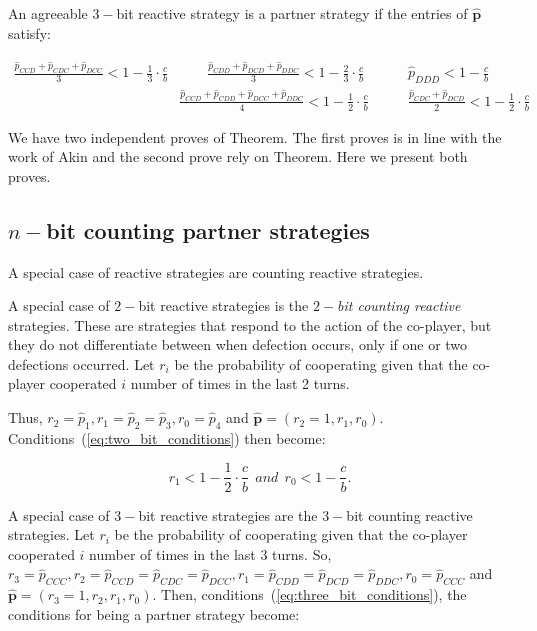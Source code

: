 \documentclass{article}
\theoremstyle{definition}
\begin{document}
An agreeable $3-$bit reactive strategy is a partner strategy if the entries of
$\mathbf{\hat{p}}$ satisfy:

\begin{align}\label{eq:three_bit_conditions}
  \frac{\hat{p}_{CCD} + \hat{p}_{CDC} + \hat{p}_{DCC}}{3} < 1\!-\! \frac{1}{3} \cdot \frac{c}{b} & \qquad 
  \frac{\hat{p}_{CDD} + \hat{p}_{DCD} + \hat{p}_{DDC}}{3} < 1\!-\! \frac{2}{3} \cdot \frac{c}{b} & \qquad 
  \hat{p}_{DDD} < 1\!-\! \frac{c}{b} \\
  & \frac{\hat{p}_{CCD} + \hat{p}_{CDD} + \hat{p}_{DCC} + \hat{p}_{DDC}}{4}  < 1\!-\! \frac{1}{2} \cdot \frac{c}{b} 
  & \qquad \frac{\hat{p}_{CDC} + \hat{p}_{DCD}}{2} < 1\!-\! \frac{1}{2} \cdot \frac{c}{b}
\end{align}

We have two independent proves of Theorem. The first proves is in line with the
work of Akin and the second prove rely on Theorem. Here we present both proves.


\subsection{$n-$bit counting partner strategies}

A special case of reactive strategies are counting reactive strategies.

A special case of $2-$bit reactive strategies is the {\it $2-$bit counting
reactive} strategies. These are strategies that respond to the action of the
co-player, but they do not differentiate between when defection occurs, only if
one or two defections occurred. Let \(r_i\) be the probability of cooperating
given that the co-player cooperated \(i\) number of times in the last 2 turns.

Thus, $r_2 = \hat{p}_1, r_1 = \hat{p}_2 =  \hat{p}_3, r_0 = \hat{p}_4$ and
$\mathbf{\hat{p}}=(r_2=1, r_1, r_0)$. Conditions~(\ref{eq:two_bit_conditions})
then become:

\begin{equation}\label{eq:counting_two_bit_conditions}
  \displaystyle r_1 < 1-\frac{1}{2} \cdot \frac{c}{b} ~~and~~ r_0 < 1\!-\! \frac{c}{b}.
\end{equation}


A special case of $3-$bit reactive strategies are the $3-$bit counting reactive
strategies. Let $r_i$ be the probability of cooperating given that the co-player
cooperated $i$ number of times in the last 3 turns. So, $r_3 = \hat{p}_{CCC},
r_2 = \hat{p}_{CCD} =  \hat{p}_{CDC} = \hat{p}_{DCC}, r_1 = \hat{p}_{CDD} =
\hat{p}_{DCD} =  \hat{p}_{DDC}, r_0 = \hat{p}_{CCC}$ and $\mathbf{\hat{p}}=(r_3=1,
r_2, r_1, r_0)$. Then, conditions~(\ref{eq:three_bit_conditions}), the
conditions for being a partner strategy become:
\end{document}
